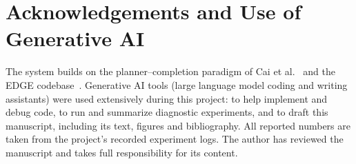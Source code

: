 \documentclass[10pt]{article}
\begin{document}
\section*{Acknowledgements and Use of Generative AI}
The system builds on the planner--completion paradigm of Cai et al.~\cite{cai2026atomic} and the EDGE codebase~\cite{tseng2023edge}.
Generative AI tools (large language model coding and writing assistants) were used extensively during this project: to help implement and debug code, to run and summarize diagnostic experiments, and to draft this manuscript, including its text, figures and bibliography.
All reported numbers are taken from the project's recorded experiment logs.
The author has reviewed the manuscript and takes full responsibility for its content.



\end{document}
